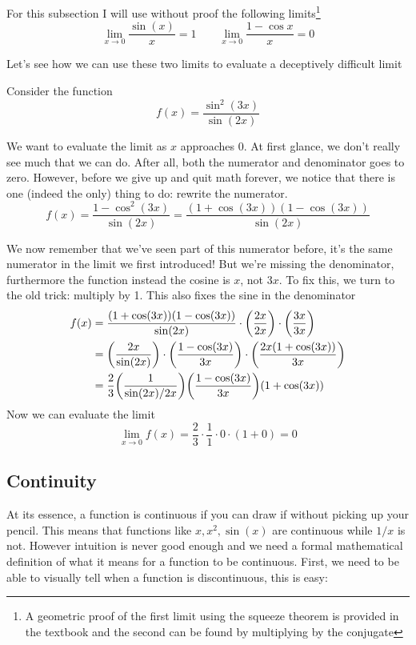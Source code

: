 \begin{Optional}
For this subsection I will use without proof the following limits\footnote{A geometric proof of the first limit using the squeeze theorem is provided in the textbook and the second can be found by multiplying by the conjugate}
\[ \lim_{x \to 0} \frac{\sin(x)}{x} = 1 \qquad \lim_{x \to 0} \frac{1 - \cos x}{x} = 0\]

Let's see how we can use these two limits to evaluate a deceptively difficult limit

\begin{example}
	Consider the function
	\[ f(x) = \frac{\sin^2(3x)}{\sin(2x)} \]
	
	We want to evaluate the limit as $x$ approaches $0	$. At first glance, we don't really see much that we can do. After all, both the numerator and denominator goes to zero. However, before we give up and quit math forever, we notice that there is one (indeed the only) thing to do: rewrite the numerator. 
	\[ f(x) = \frac{1 - \cos^2(3x)}{\sin(2x)} = \frac{(1 + \cos(3x))(1 - \cos(3x))}{\sin(2x)} \]
	
	We now remember that we've seen part of this numerator before, it's the same numerator in the limit we first introduced! But we're missing the denominator, furthermore the function instead the cosine is $x$, not $3x$. To fix this, we turn to the old trick: multiply by 1. This also fixes the sine in the denominator
	\begin{align*}
		f(x) &= \frac{(1 + \cos(3x))(1 - \cos(3x))}{\sin(2x)} \cdot \qty(\frac{2x}{2x}) \cdot \qty(\frac{3x}{3x}) \\
		&= \qty(\frac{2x}{\sin(2x)}) \cdot \qty(\frac{1 - \cos(3x)}{3x}) \cdot \qty(\frac{2x(1 + \cos(3x))}{3x}) \\
		&= \frac{2}{3} \qty(\frac{1}{\sin(2x)/2x}) \qty(\frac{1 - \cos(3x)}{3x}) (1 + \cos(3x))
	\end{align*}
	Now we can evaluate the limit
	\[ \lim_{x \to 0} f(x) = \frac{2}{3} \cdot \frac{1}{1} \cdot 0 \cdot (1 + 0) = 0 \]
\end{example}

\end{Optional}

\newpage 
\subsection{Continuity}

At its essence, a function is continuous if you can draw if without picking up your pencil. This means that functions like $x, x^2, \sin(x)$ are continuous while $1/x$ is not. However intuition is never good enough and we need a formal mathematical definition of what it means for a function to be continuous. First, we need to be able to visually tell when a function is discontinuous, this is easy:

